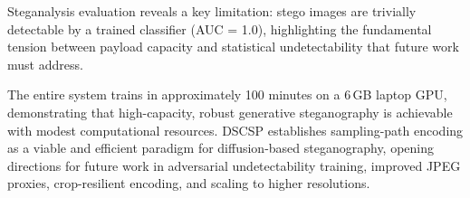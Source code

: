 \documentclass[10pt, twocolumn]{article}
\begin{document}
Steganalysis evaluation reveals a key limitation: stego images are trivially detectable by a trained classifier (AUC = 1.0), highlighting the fundamental tension between payload capacity and statistical undetectability that future work must address.

The entire system trains in approximately 100 minutes on a 6\,GB laptop GPU, demonstrating that high-capacity, robust generative steganography is achievable with modest computational resources.
DSCSP establishes sampling-path encoding as a viable and efficient paradigm for diffusion-based steganography, opening directions for future work in adversarial undetectability training, improved JPEG proxies, crop-resilient encoding, and scaling to higher resolutions.



\end{document}

